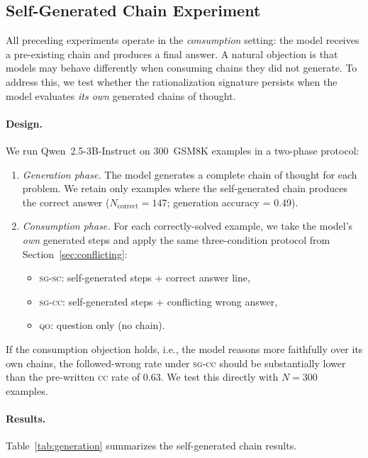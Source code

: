 \documentclass{article}
\theoremstyle{definition}
\theoremstyle{definition}
\newcommand{\CCFW}{0.63}
\newcommand{\GENNEXAMPLES}{300}
\newcommand{\GENNCORRECT}{147}
\newcommand{\GENNACC}{0.49}
\begin{document}
\subsection{Self-Generated Chain Experiment}
\label{sec:generation}

All preceding experiments operate in the \emph{consumption} setting: the
model receives a pre-existing chain and produces a final answer. A natural
objection is that models may behave differently when consuming chains they
did not generate. To address this, we test whether the rationalization
signature persists when the model evaluates \emph{its own} generated chains
of thought.

\paragraph{Design.}
We run Qwen~2.5-3B-Instruct on \GENNEXAMPLES\ GSM8K examples in a
two-phase protocol:
\begin{enumerate}[nosep]
\item \emph{Generation phase.}  The model generates a complete chain of
  thought for each problem. We retain only examples where the self-generated
  chain produces the correct answer ($N_{\text{correct}} = \GENNCORRECT$;
  generation accuracy = \GENNACC).
\item \emph{Consumption phase.}  For each correctly-solved example, we
  take the model's \emph{own} generated steps and apply the same three-condition
  protocol from Section~\ref{sec:conflicting}:
  \begin{itemize}[nosep]
  \item \textsc{sg-sc}: self-generated steps + correct answer line,
  \item \textsc{sg-cc}: self-generated steps + conflicting wrong answer,
  \item \textsc{qo}: question only (no chain).
  \end{itemize}
\end{enumerate}
If the consumption objection holds, i.e., the model reasons more faithfully
over its own chains, the followed-wrong rate under \textsc{sg-cc} should be
substantially lower than the pre-written \textsc{cc} rate of \CCFW.
We test this directly with $N{=}\GENNEXAMPLES$ examples.

\paragraph{Results.}
Table~\ref{tab:generation} summarizes the self-generated chain results.
\end{document}
